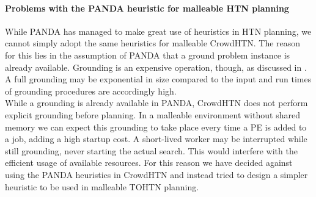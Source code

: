 \paragraph{Problems with the PANDA heuristic for malleable HTN planning}
While PANDA has managed to make great use of heuristics in HTN planning, we cannot simply adopt the same heuristics for malleable CrowdHTN. The reason for this lies in the assumption of PANDA that a ground problem instance is already available. Grounding is an expensive operation, though, as discussed in \cite{behnke2020succinct}. A full grounding may be exponential in size compared to the input and run times of grounding procedures are accordingly high. \\
While a grounding is already available in PANDA, CrowdHTN does not perform explicit grounding before planning. In a malleable environment without shared memory we can expect this grounding to take place every time a PE is added to a job, adding a high startup cost. A short-lived worker may be interrupted while still grounding, never starting the actual search. This would interfere with the efficient usage of available resources. For this reason we have decided against using the PANDA heuristics in CrowdHTN and instead tried to design a simpler heuristic to be used in malleable TOHTN planning.

